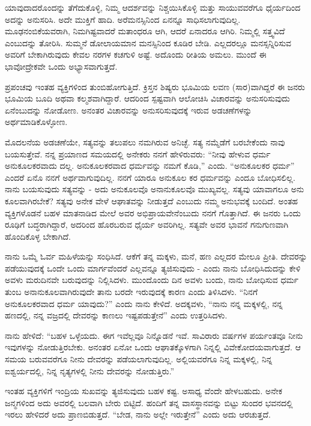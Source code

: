 ಯಾವುದಾದರೊಂದನ್ನು ತೆಗೆದುಕೊಳ್ಳಿ, ನಿಮ್ಮ ಆದರ್ಶವನ್ನು ನಿಶ್ಚಯಿಸಿಕೊಳ್ಳಿ ಮತ್ತು ಸಾಯುವವರೆಗೂ ಧೈರ್ಯದಿಂದ ಅದನ್ನು ಅನುಸರಿಸಿ. ಅದೇ ಮುಕ್ತಿಗೆ ಹಾದಿ. ಅರೆಮನಸ್ಸಿನಿಂದ ಏನನ್ನೂ ಸಾಧಿಸಲಾಗುವುದಿಲ್ಲ. ಮೂಢನಂಬಿಕೆಯವರಾಗಿ, ನಿಮಗಿಷ್ಟವಾದರೆ ಮತಾಂಧರೂ ಆಗಿ, ಆದರೆ ಏನಾದರೂ ಆಗಿರಿ. ನಿಮ್ಮಲ್ಲಿ ಸತ್ತ್ವವಿದೆ ಎಂಬುದನ್ನು ತೋರಿಸಿ. ಸುಮ್ಮನೆ ಡೋಲಾಯಮಾನ ಮನಸ್ಸಿನಿಂದ ಕೂಡಿರ ಬೇಡಿ. ಎಲ್ಲದರಲ್ಲೂ ಮನಸ್ಸನ್ನಿರಿಸುವ ಅವರಿಗೆ ಬೇಕಾಗಿರುವುದು ಕೇವಲ ನರಗಳ ಕಚಗುಳಿ ಅಷ್ಟೆ. ಅದೊಂದು ರೀತಿಯ ಅಮಲು. ಮುಂದೆ ಈ ಭಾವೋದ್ರೇಕವೇ ಒಂದು ಅಭ್ಯಾಸವಾಗುತ್ತದೆ.

ಪ್ರಪಂಚವು ಇಂತಹ ವ್ಯಕ್ತಿಗಳಿಂದ ತುಂಬಿಹೋಗುತ್ತಿದೆ. ಕ್ರಿಸ್ತನ ಶಿಷ್ಯರು ಭೂಮಿಯ ಲವಣ (ಸಾರ)ವಾಗಿದ್ದರೆ  ಈ ಜನರು ಭೂಮಿಯ ಬೂದಿ ಅಥವಾ ಕಲ್ಮಶವಾಗಿದ್ದಾರೆ. ಆದರಿಂದ ಸ್ಪಷ್ಟವಾಗಿ ಆಲೋಚಿಸಿ ವಿಚಾರವನ್ನು ಅನುಸರಿಸುವುದು ಏನೆಂಬುದನ್ನು ನೋಡೋಣ. ಅನಂತರ ವಿಚಾರವನ್ನು ಅನುಸರಿಸುವುದಕ್ಕೆ ಇರುವ ಅಡಚಣೆಗಳನ್ನು ಅರ್ಥಮಾಡಿಕೊಳ್ಳೋಣ.

ಮೊದಲನೆಯ ಅಡಚಣೆಯೇ, ಸತ್ಯವನ್ನು ತಲುಪಲು ನಮಗಿರುವ ಅನಿಚ್ಛೆ. ಸತ್ಯ ನಮ್ಮೆಡೆಗೆ ಬರಬೇಕೆಂದು ನಾವು ಬಯಸುತ್ತೇವೆ. ನನ್ನ ಪ್ರಯಾಣದ ಸಮಯದಲ್ಲಿ ಅನೇಕರು ನನಗೆ ಹೇಳಿರುವರು: “ನೀವು ಹೇಳುವ ಧರ್ಮ ಅನುಕೂಲಕರವಾದು ದಲ್ಲ. ಅನುಕೂಲಕರವಾದ ಧರ್ಮವನ್ನು ನಮಗೆ ಕೊಡಿ,” ಎಂದು. “ಅನುಕೂಲಕರ ಧರ್ಮ” ಎಂದರೆ ಏನೊ ನನಗೆ ಅರ್ಥವಾಗುವುದಿಲ್ಲ. ನನಗೆ ಯಾರೂ ಅನುಕೂಲ ಕರ ಧರ್ಮವನ್ನು ಎಂದೂ ಬೋಧಿಸಲಿಲ್ಲ. ನಾನು ಬಯಸುವುದು ಸತ್ಯವನ್ನು - ಅದು ಅನುಕೂಲವೊ ಅನಾನುಕೂಲವೊ ಮುಖ್ಯವಲ್ಲ. ಸತ್ಯವು ಯಾವಾಗಲೂ ಅನು ಕೂಲವಾಗಿರಬೇಕೆ? ಸತ್ಯವು ಅನೇಕ ವೇಳೆ ಆಘಾತವನ್ನು ನೀಡುತ್ತದೆ ಎಂಬುದು ನಮ್ಮ ಅನುಭವಕ್ಕೆ ಬಂದಿದೆ. ಅಂತಹ ವ್ಯಕ್ತಿಗಳೊಡನೆ ಬಹಳ ಮಾತನಾಡಿದ ಮೇಲೆ ಅವರ ಅಭಿಪ್ರಾಯವೇನೆಂಬುದು ನನಗೆ ಗೊತ್ತಾಗಿದೆ. ಈ ಜನರು ಒಂದು ರೂಢಿಗೆ ಬದ್ಧರಾಗಿದ್ದಾರೆ, ಅದರಿಂದ ಹೊರಬರುವ ಧೈರ್ಯ ಅವರಿಗಿಲ್ಲ. ಸತ್ಯವೇ ಅವರ ಭಾವನೆ ಗನುಗುಣವಾಗಿ ಹೊಂದಿಕೊಳ್ಳ ಬೇಕಾಗಿದೆ.

ನಾನು ಒಮ್ಮೆ ಓರ್ವ ಮಹಿಳೆಯನ್ನು ಸಂಧಿಸಿದೆ. ಆಕೆಗೆ ತನ್ನ ಮಕ್ಕಳು, ಮನೆ, ಹಣ ಎಲ್ಲದರ ಮೇಲೂ ಪ್ರೀತಿ. ದೇವರನ್ನು ಪಡೆಯುವುದಕ್ಕೆ ಒಂದೇ ಒಂದು ಮಾರ್ಗವೆಂದರೆ ಎಲ್ಲವನ್ನೂ ತ್ಯಜಿಸುವುದು - ಎಂದು ನಾನು ಬೋಧಿಸಿದುದನ್ನು ಕೇಳಿ ಅವಳು ಮರುದಿನವೇ ಬರುವುದನ್ನು ನಿಲ್ಲಿಸಿದಳು. ಮುಂದೊಂದು ದಿನ ಅವಳು ಬಂದು, ನಾನು ಬೋಧಿಸುವ ಧರ್ಮ ತುಂಬ ಅನಾನುಕೂಲವಾಗಿರುವುದೇ ತಾನು ಬರದೇ ಇರುವುದಕ್ಕೆ ಕಾರಣ ಎಂದು ತಿಳಿಸಿದಳು. “ನಿನಗೆ ಅನುಕೂಲಕರವಾದ ಧರ್ಮ ಯಾವುದು?” ಎಂದು ನಾನು ಕೇಳಿದೆ. ಅದಕ್ಕವಳು, “ನಾನು ನನ್ನ ಮಕ್ಕಳಲ್ಲಿ, ನನ್ನ ಹಣದಲ್ಲಿ, ನನ್ನ ವಜ್ರದಲ್ಲಿ ದೇವರನ್ನು ಕಾಣಲು ಇಷ್ಟಪಡುತ್ತೇನೆ” ಎಂದು ಉತ್ತರಿಸಿದಳು.

ನಾನು ಹೇಳಿದೆ: “ಬಹಳ ಒಳ್ಳೆಯದು. ಈಗ ಇವೆಲ್ಲವೂ ನಿನ್ನೊಡನೆ ಇವೆ. ಸಾವಿರಾರು ವರ್ಷಗಳ ಪರ್ಯಂತವೂ ನೀನು ಇವುಗಳನ್ನು ನೋಡುತ್ತಿರಬೇಕು. ಅನಂತರ ಏನೋ ಒಂದು ಆಘಾತಕ್ಕೊಳಗಾಗಿ ನಿನ್ನಲ್ಲಿ ವಿವೇಕೋದಯವಾಗುತ್ತದೆ. ಆ ಸಮಯ ಬರುವವರೆಗೂ ನೀನು ದೇವರನ್ನು ಪಡೆಯಲಾಗುವುದಿಲ್ಲ. ಅಲ್ಲಿಯವರೆಗೂ ನಿನ್ನ ಮಕ್ಕಳಲ್ಲಿ, ನಿನ್ನ ಐಶ್ವರ್ಯದಲ್ಲಿ, ನಿನ್ನ ನೃತ್ಯಗಳಲ್ಲಿ ನೀನು ದೇವರನ್ನು ನೋಡುತ್ತಿರು.”

ಇಂತಹ ವ್ಯಕ್ತಿಗಳಿಗೆ ಇಂದ್ರಿಯ ಸುಖವನ್ನು ತ್ಯಜಿಸುವುದು ಬಹಳ ಕಷ್ಟ. ಅಸಾಧ್ಯ ವೆಂದೇ ಹೇಳಬಹುದು. ಅನೇಕ ಜನ್ಮಗಳಿಂದ ಅದು ಅವರಲ್ಲಿ ಬಲವಾಗಿ ಬೇರು ಬಿಟ್ಟಿದೆ. ಹಂದಿಗೆ ತನ್ನ ವಾಸಸ್ಥಾನವನ್ನು ಬಿಟ್ಟು ಸುಂದರ ಭವನದಲ್ಲಿ ಇರಲು ಹೇಳಿದರೆ ಅದು ಪ್ರಾಣಬಿಡುತ್ತದೆ. “ಬೇಡ, ನಾನು ಅಲ್ಲೇ ಇರುತ್ತೇನೆ” ಎಂದು ಅದು ಆರಚುತ್ತದೆ.

